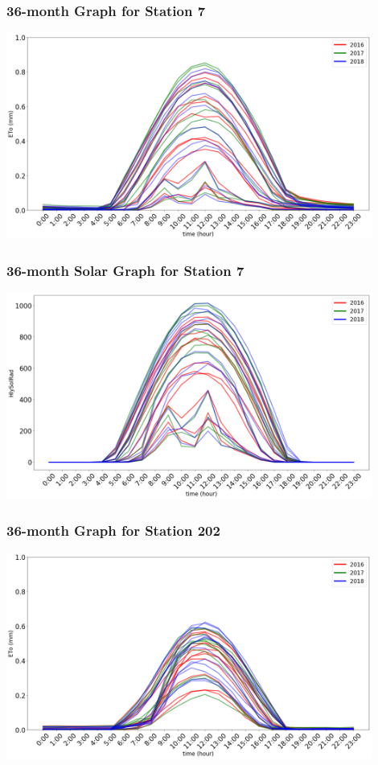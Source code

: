 \begin{frame}
\frametitle{36-month Graph for Station 7}
\centering
\includegraphics[width=0.9\textwidth]{images/7multi.png}
\end{frame}


\begin{frame}
\frametitle{36-month Solar Graph for Station 7}
\centering
\includegraphics[width=0.9\textwidth]{images/3year7solar.png}
\end{frame}


\begin{frame}
\frametitle{36-month Graph for Station 202}
\centering
\includegraphics[width=0.9\textwidth]{images/202multi.png}
\end{frame}

